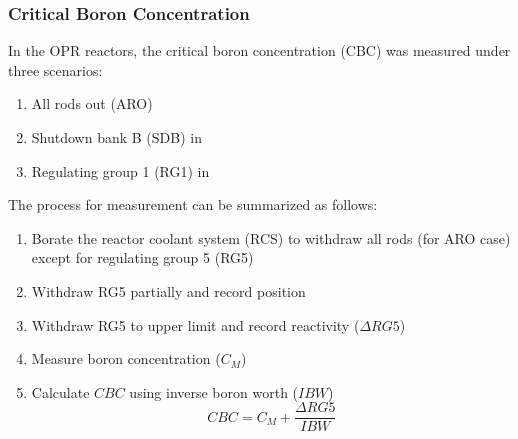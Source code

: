 \documentclass{article}
\begin{document}
\subsubsection{Critical Boron Concentration}

In the OPR reactors, the critical boron concentration (CBC) was measured under three scenarios:
\begin{enumerate}
\item All rods out (ARO)
\item Shutdown bank B (SDB) in
\item Regulating group 1 (RG1) in
\end{enumerate}

The process for measurement can be summarized as follows:
\begin{enumerate}
\item Borate the reactor coolant system (RCS) to withdraw all rods (for ARO case) except for regulating group 5 (RG5)
\item Withdraw RG5 partially and record position
\item Withdraw RG5 to upper limit and record reactivity ($\Delta RG5$)
\item Measure boron concentration ($C_M$)
\item Calculate $CBC$ using inverse boron worth ($IBW$)
\begin{equation}
  CBC = C_M + \frac{\Delta RG5}{IBW}
\end{equation}
\end{enumerate}
\end{document}
